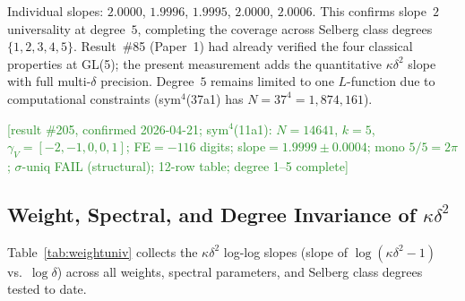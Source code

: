 \documentclass[11pt, a4paper]{article}
\theoremstyle{plain}
\theoremstyle{definition}
\begin{document}
Individual slopes: $2.0000$, $1.9996$, $1.9995$, $2.0000$, $2.0006$.
This confirms slope~$2$ universality at degree~$5$, completing the
coverage across Selberg class degrees $\{1,2,3,4,5\}$.
Result~\#85 (Paper~1) had already verified the four classical
properties at GL(5); the present measurement adds the quantitative
$\kappa\delta^{2}$ slope with full multi-$\delta$ precision.
Degree~$5$ remains limited to one $L$-function due to computational
constraints (sym$^4$(37a1) has $N=37^4=1{,}874{,}161$).

\textcolor{ForestGreen}{[result \#205, confirmed 2026-04-21;
sym$^4$(11a1): $N{=}14641$, $k{=}5$, $\gamma_V{=}[-2,-1,0,0,1]$;
FE${=}-116$ digits; slope${=}1.9999{\pm}0.0004$; mono $5/5{=}2\pi$;
$\sigma$-uniq FAIL (structural); 12-row table; degree 1--5 complete]}


\subsection{Weight, Spectral, and Degree Invariance of $\kappa\delta^{2}$}
\label{ssec:weightinv}

Table~\ref{tab:weightuniv} collects the $\kappa\delta^{2}$ log-log slopes
(slope of $\log(\kappa\delta^{2}-1)$ vs.\ $\log\delta$) across all
weights, spectral parameters, and Selberg class degrees tested to date.
\end{document}
